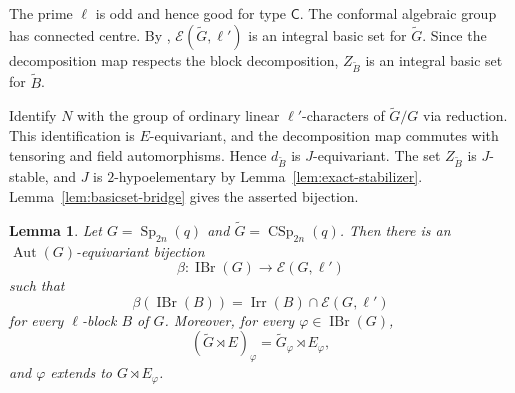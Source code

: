 \documentclass[10pt]{amsart}
\newtheorem{lemma}[theorem]{Lemma}
\theoremstyle{definition}
\let\oldendproof\endproof
\renewenvironment{proof}[1][\proofname]{%
  \oldproof[\bfseries #1]%
}{\oldendproof}
\DeclareMathOperator{\Aut}{Aut}
\DeclareMathOperator{\IBr}{IBr}
\DeclareMathOperator{\Irr}{Irr}
\DeclareMathOperator{\Sp}{Sp}
\DeclareMathOperator{\CSp}{CSp}
\numberwithin{equation}{section}
\numberwithin{table}{section}
\begin{document}
\begin{proof}
The prime $\ell$ is odd and hence good for type $\mathsf C$.
The conformal algebraic group has connected centre.  By
\cite[Theorem~5.1]{GeckHiss1991}, $\mathcal E(\widetilde G,\ell')$
is an integral basic set for $\widetilde G$.
Since the decomposition map respects the block decomposition, $Z_{\widetilde B}$
is an integral basic set for $\widetilde B$.

Identify $N$ with the group of ordinary linear $\ell'$-characters of
$\widetilde G/G$ via reduction.  This identification is $E$-equivariant,
and the decomposition map commutes with tensoring and field
automorphisms.  Hence $d_{\widetilde B}$ is $J$-equivariant.
The set $Z_{\widetilde B}$ is $J$-stable, and $J$ is
$2$-hypoelementary by Lemma~\ref{lem:exact-stabilizer}.
Lemma~\ref{lem:basicset-bridge} gives the asserted bijection.
\end{proof}

\begin{lemma}
\label{lem:odd-g-factorization}
Let $G=\Sp_{2n}(q)$ and $\widetilde G=\CSp_{2n}(q)$.
Then there is an $\Aut(G)$-equivariant bijection
\[
  \beta:\IBr(G)\longrightarrow\mathcal E(G,\ell')
\]
such that
\[
  \beta(\IBr(B))=\Irr(B)\cap\mathcal E(G,\ell')
\]
for every $\ell$-block $B$ of $G$.
Moreover, for every $\varphi\in\IBr(G)$,
\[
  (\widetilde G\rtimes E)_\varphi
    =\widetilde G_\varphi\rtimes E_\varphi,
\]
and $\varphi$ extends to $G\rtimes E_\varphi$.
\end{lemma}
\end{document}
